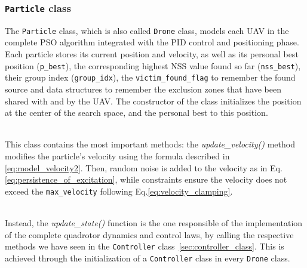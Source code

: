 \documentclass[main]{subfiles}
\begin{document}
\subsubsection{\texttt{Particle} class}
The \texttt{Particle} class, which is also called \texttt{Drone} 
class, models each UAV in the complete PSO algorithm integrated with the PID
control and positioning phase. 
\noindent\\
Each particle stores its current 
position and velocity, as well as its personal 
best position (\texttt{p\_best}), the corresponding
highest NSS value found so far (\texttt{nss\_best}), 
their group index (\texttt{group\_idx}), 
the \texttt{victim\_found\_flag} to remember the found source and 
data structures to remember the exclusion zones 
that have been shared with and by the UAV.
The constructor of the class initializes the position 
at the center of the search space, and the personal best
to this position.

\noindent\\
This class contains the most important 
methods: the \textit{update\_velocity()} method modifies the 
particle's velocity using the formula described
in \ref{eq:model_velocity2}. Then, random noise is 
added to the velocity as in Eq.\ref{eq:persistence_of_excitation},
while constraints ensure the velocity does not 
exceed the \texttt{max\_velocity} following Eq.\ref{eq:velocity_clamping}.

\noindent\\
Instead, the \textit{update\_state()} function is the one responsible
of the implementation of the complete quadrotor dynamics
and control laws, by calling the respective methods we have seen 
in the \texttt{Controller} class~\ref{sec:controller_class}.
This is achieved through the initialization of a \texttt{Controller}
class in every \texttt{Drone} class.
\end{document}
